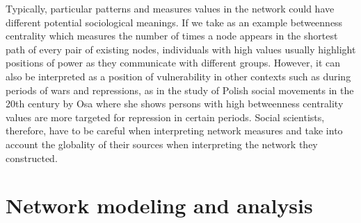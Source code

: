 Typically, particular patterns and measures values in the network could have different potential sociological meanings.
If we take as an example betweenness centrality which measures the number of times a node appears in the shortest path of every pair of existing nodes, individuals with high values usually highlight positions of power as they communicate with different groups.
However, it can also be interpreted as a position of vulnerability in other contexts such as during periods of wars and repressions, as in the study of Polish social movements in the 20th century by Osa \cite{osaSolidarityContentionNetworks2003} where she shows persons with high betweenness centrality values are more targeted for repression in certain periods.
Social scientists, therefore, have to be careful when interpreting network measures and take into account the globality of their sources when interpreting the network they constructed.


\section{Network modeling and analysis}\label{sec:modeling}



